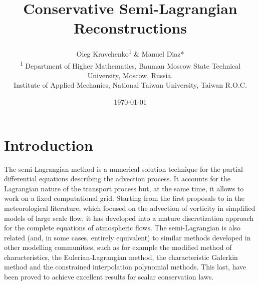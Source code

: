\documentclass[10pt,a4paper]{article}
\begin{document}
\title{Conservative Semi-Lagrangian Reconstructions}
\author{Oleg Kravchenko\textsuperscript{1} \& Manuel Diaz* \\ 
\small \textsuperscript{1} Department of Higher Mathematics, Bauman Moscow State Technical University, Moscow, Russia. \\[-3mm]
\small * Institute of Applied Mechanics, National Taiwan University, Taiwan R.O.C.}
\date{\today}

\maketitle

\linenumbers


\section{Introduction}

%
%
%
%

The semi-Lagrangian method is a numerical solution technique for the partial differential equations describing the advection process. It accounts for the Lagrangian nature of the transport process but, at the same time, it allows to work on a fixed computational grid. Starting from the first proposals to in the meteorological literature, which focused on the advection of vorticity in simplified models of large scale flow, it has developed into a mature discretization approach for the complete equations of atmospheric flows. The semi-Lagrangian is also related (and, in some cases, entirely equivalent) to similar methods developed in other modelling communities, such as for example the modified method of characteristics, the Eulerian-Lagrangian method, the characteristic Galerkin method and the constrained interpolation polynomial methods. This last, have been proved to achieve excellent results for scalar conservation laws.
%
\end{document}

